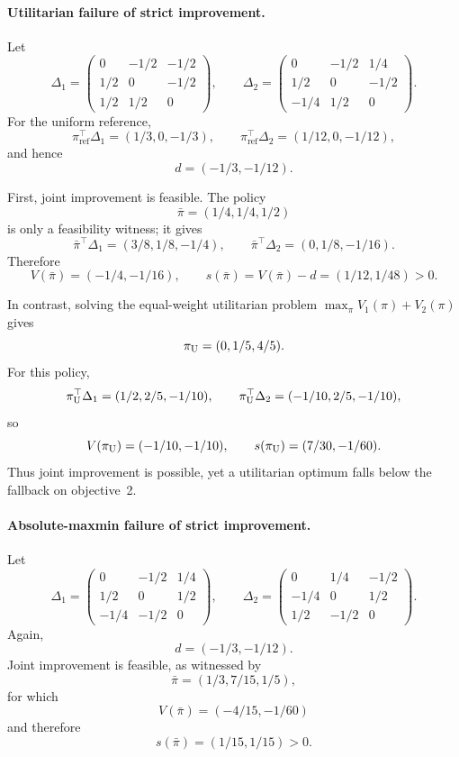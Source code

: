 \documentclass{article}
\theoremstyle{remark}
\theoremstyle{plain}
\newcommand{\piref}{\pi_{\mathrm{ref}}}
\begin{document}
\paragraph{Utilitarian failure of strict improvement.}
Let
\[
\Delta_1=
\begin{pmatrix}
0&-1/2&-1/2\\
1/2&0&-1/2\\
1/2&1/2&0
\end{pmatrix},
\qquad
\Delta_2=
\begin{pmatrix}
0&-1/2&1/4\\
1/2&0&-1/2\\
-1/4&1/2&0
\end{pmatrix}.
\]
For the uniform reference,
\[
\piref^\top \Delta_1=(1/3,0,-1/3),
\qquad
\piref^\top \Delta_2=(1/12,0,-1/12),
\]
and hence
\[
d=(-1/3,-1/12).
\]

First, joint improvement is feasible. The policy
\[
\bar\pi=(1/4,1/4,1/2)
\]
is only a feasibility witness; it gives
\[
\bar\pi^\top \Delta_1=(3/8,1/8,-1/4),
\qquad
\bar\pi^\top \Delta_2=(0,1/8,-1/16).
\]
Therefore
\[
V(\bar\pi)=(-1/4,-1/16),
\qquad
s(\bar\pi)
=
V(\bar\pi)-d
=
(1/12,1/48)>0.
\]

In contrast, solving the equal-weight utilitarian problem
$\max_\pi V_1(\pi)+V_2(\pi)$ gives
\[
\pi_{\rm U}=(0,1/5,4/5).
\]
For this policy,
\[
\pi_{\rm U}^\top \Delta_1=(1/2,2/5,-1/10),
\qquad
\pi_{\rm U}^\top \Delta_2=(-1/10,2/5,-1/10),
\]
so
\[
V(\pi_{\rm U})=(-1/10,-1/10),
\qquad
s(\pi_{\rm U})
=
(7/30,-1/60).
\]
Thus joint improvement is possible, yet a utilitarian optimum falls
below the fallback on objective~2.

\paragraph{Absolute-maxmin failure of strict improvement.}
Let
\[
\Delta_1=
\begin{pmatrix}
0&-1/2&1/4\\
1/2&0&1/2\\
-1/4&-1/2&0
\end{pmatrix},
\qquad
\Delta_2=
\begin{pmatrix}
0&1/4&-1/2\\
-1/4&0&1/2\\
1/2&-1/2&0
\end{pmatrix}.
\]
Again,
\[
d=(-1/3,-1/12).
\]
Joint improvement is feasible, as witnessed by
\[
\bar\pi=(1/3,7/15,1/5),
\]
for which
\[
V(\bar\pi)=(-4/15,-1/60)
\]
and therefore
\[
s(\bar\pi)=(1/15,1/15)>0.
\]
\end{document}
